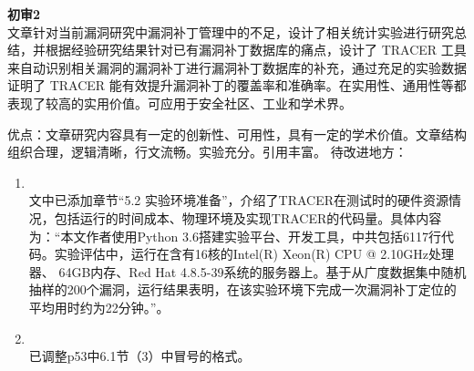 \textbf{初审2}\\
文章针对当前漏洞研究中漏洞补丁管理中的不足，设计了相关统计实验进行研究总结，并根据经验研究结果针对已有漏洞补丁数据库的痛点，设计了 TRACER 工具来自动识别相关漏洞的漏洞补丁进行漏洞补丁数据库的补充，通过充足的实验数据证明了 TRACER 能有效提升漏洞补丁的覆盖率和准确率。在实用性、通用性等都表现了较高的实用价值。可应用于安全社区、工业和学术界。

优点：文章研究内容具有一定的创新性、可用性，具有一定的学术价值。文章结构组织合理，逻辑清晰，行文流畅。实验充分。引用丰富。
待改进地方： 
\begin{enumerate}[]
    \item {}\\
      文中已添加章节“5.2 实验环境准备”，介绍了TRACER在测试时的硬件资源情况，包括运行的时间成本、物理环境及实现TRACER的代码量。具体内容为：“本文作者使用Python 3.6搭建实验平台、开发工具\tool ，\tool 中共包括6117行代码。实验评估中，\tool 运行在含有16核的Intel(R) Xeon(R) CPU @ 2.10GHz处理器、 64GB内存、Red Hat 4.8.5-39系统的服务器上。基于从广度数据集中随机抽样的200个漏洞，运行结果表明，\tool 在该实验环境下完成一次漏洞补丁定位的平均用时约为22分钟。”。
    \item {}\\
      已调整p53中6.1节（3）中冒号的格式。
\end{enumerate}



